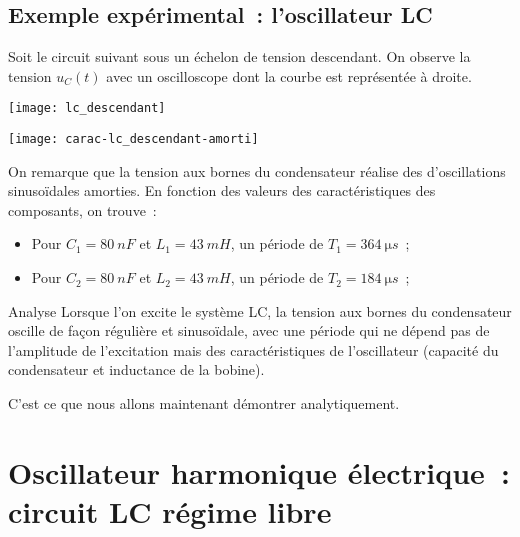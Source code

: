 \documentclass[../main/main.tex]{subfiles}
\begin{document}
\subsection{Exemple expérimental~: l'oscillateur LC}

Soit le circuit suivant sous un échelon de tension descendant. On observe la
tension $u_C(t)$ avec un oscilloscope dont la courbe est représentée à droite.

\begin{minipage}{0.50\linewidth}
    \begin{center}
        \texttt{[image: lc\_descendant]}
    \end{center}
\end{minipage}
\begin{minipage}{0.50\linewidth}
    \begin{center}
        \texttt{[image: carac-lc\_descendant-amorti]}
    \end{center}
\end{minipage}

On remarque que la tension aux bornes du condensateur réalise des d'oscillations
sinusoïdales amorties. En fonction des valeurs des caractéristiques des
composants, on trouve~:
\begin{itemize}
    \item Pour $C_1 = \SI{80}{nF}$ et $L_1 = \SI{43}{mH}$, un période de $T_1 =
        \SI{364}{\micro s}$~;
    \item Pour $C_2 = \SI{80}{nF}$ et $L_2 = \SI{43}{mH}$, un période de $T_2 =
        \SI{184}{\micro s}$~;
\end{itemize}

\begin{instruc}{Analyse}
    Lorsque l'on excite le système LC, la tension aux bornes du condensateur
    oscille de façon régulière et sinusoïdale, avec une période qui ne dépend pas
    de l'amplitude de l'excitation mais des caractéristiques de l'oscillateur
    (capacité du condensateur et inductance de la bobine). 
\end{instruc}

C'est ce que nous allons maintenant démontrer analytiquement.

\section{Oscillateur harmonique électrique~: circuit LC régime libre}
\end{document}
